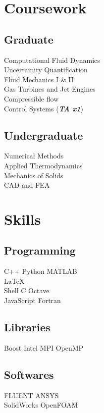 \documentclass[]{resume}
\begin{document}
\begin{minipage}[t]{0.33\textwidth}

\section{Coursework}
\subsection{Graduate}
Computational Fluid Dynamics \\
Uncertainity Quantification \\
Fluid Mechanics I \& II \\
Gas Turbines and Jet Engines \\
Compressible flow \\
Control Systems (\textbf{\textit{TA x1}}) \\
\sectionsep

\subsection{Undergraduate}
Numerical Methods \\
Applied Thermodynamics \\
Mechanics of Solids \\
CAD and FEA \\


\section{Skills}
\subsection{Programming}
C++ \textbullet{} Python \textbullet{} MATLAB \\
\LaTeX\ \textbullet{} \\
Shell \textbullet{} C \textbullet{} Octave  \\
JavaScript \textbullet{} Fortran \\
\sectionsep
\subsection{Libraries}
Boost \textbullet{} Intel MPI \textbullet{} OpenMP \\
\sectionsep
\subsection{Softwares}
FLUENT \textbullet{} ANSYS \textbullet{} \\
SolidWorks \textbullet{} OpenFOAM \\
\sectionsep

%
%

\end{minipage}
\end{document}
